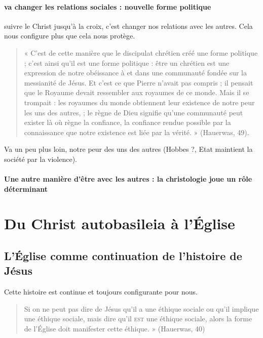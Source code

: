 \paragraph{va changer les relations sociales : nouvelle forme politique} suivre le Christ jusqu'à la croix, c'est changer nos relations avec les autres. Cela nous configure plus que cela nous protège. 

\begin{quote}
    « C’est de cette manière que le discipulat chrétien créé une forme politique ; c’est ainsi qu’il est une
forme politique : être un chrétien est une expression de notre obéissance à et dans une communauté
fondée sur la messianité de Jésus. Et c’est ce que Pierre n’avait pas compris ; il pensait que le
Royaume devait ressembler aux royaumes de ce monde. Mais il se trompait : les royaumes du monde
obtiennent leur existence de notre peur les uns des autres, ; le règne de Dieu signifie qu’une
communauté peut exister là où règne la confiance, la confiance rendue possible par la connaissance
que notre existence est liée par la vérité. » (Hauerwas, 49).
\end{quote}

Va un peu plus loin, notre peur des uns des autres (Hobbes ?, Etat maintient la société par la violence). 


\paragraph{Une autre manière d'être avec les autres : la christologie joue un rôle déterminant}


\section{Du Christ autobasileia à l’Église}

\subsection{L’Église comme continuation de l’histoire de Jésus}

Cette histoire est continue et toujours configurante pour nous. 


\begin{quote}
    Si on ne peut pas dire de Jésus qu’il a une éthique sociale ou qu’il implique une éthique sociale, mais
dire qu’il \textsc{est} une éthique sociale, alors la forme de l’Église doit manifester cette éthique. » (Hauerwas,
40)
\end{quote}


